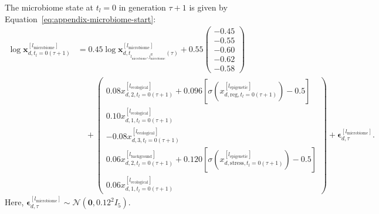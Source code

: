 \documentclass[11pt]{article}
\begin{document}
The microbiome state at $t_l=0$ in generation $\tau+1$ is given by Equation~\ref{eq:appendix-microbiome-start}:
\begin{equation}
\begin{aligned}
\log\mathbf{x}^{[l_{\mathrm{microbiome}}]}_{d,t_l=0(\tau+1)}
&=0.45\log\mathbf{x}^{[l_{\mathrm{microbiome}}]}_{d,t_{l_{\mathrm{microbiome}},j_{\mathrm{microbiome}}^R}(\tau)}
+0.55
\begin{pmatrix}
-0.45\\
-0.55\\
-0.60\\
-0.62\\
-0.58
\end{pmatrix}\\
&\quad+
\begin{pmatrix}
0.08x^{[l_{\mathrm{ecological}}]}_{d,2,t_l=0(\tau+1)}
+0.096\!\left[\sigma\!\left(x^{[l_{\mathrm{epigenetic}}]}_{d,\mathrm{reg},t_l=0(\tau+1)}\right)-0.5\right]\\
0.10x^{[l_{\mathrm{ecological}}]}_{d,1,t_l=0(\tau+1)}\\
-0.08x^{[l_{\mathrm{ecological}}]}_{d,3,t_l=0(\tau+1)}\\
0.06x^{[l_{\mathrm{background}}]}_{d,2,t_l=0(\tau+1)}
+0.120\!\left[\sigma\!\left(x^{[l_{\mathrm{epigenetic}}]}_{d,\mathrm{stress},t_l=0(\tau+1)}\right)-0.5\right]\\
0.06x^{[l_{\mathrm{ecological}}]}_{d,1,t_l=0(\tau+1)}
\end{pmatrix}
+\boldsymbol{\epsilon}^{[l_{\mathrm{microbiome}}]}_{d,\tau}.
\end{aligned}
\label{eq:appendix-microbiome-start}
\end{equation}
Here, $\boldsymbol{\epsilon}^{[l_{\mathrm{microbiome}}]}_{d,\tau}\sim\mathcal{N}(\mathbf{0},0.12^2I_5)$.
\end{document}
